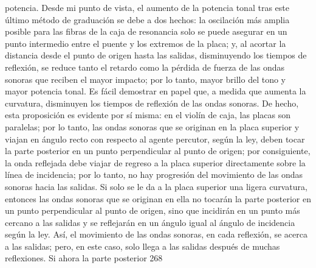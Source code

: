 potencia. Desde mi punto de vista, el aumento de la potencia tonal tras este último método de graduación se debe a dos hechos: la oscilación más amplia posible para las fibras de la caja de resonancia solo se puede asegurar en un punto intermedio entre el puente y los extremos de la placa; y, al acortar la distancia desde el punto de origen hasta las salidas, disminuyendo los tiempos de reflexión, se reduce tanto el retardo como la pérdida de fuerza de las ondas sonoras que reciben el mayor impacto; por lo tanto, mayor brillo del tono y mayor potencia tonal.
Es fácil demostrar en papel que, a medida que aumenta la curvatura, disminuyen los tiempos de reflexión de las ondas sonoras. De hecho, esta proposición es evidente por sí misma: en el violín de caja, las placas son paralelas; por lo tanto, las ondas sonoras que se originan en la placa superior y viajan en ángulo recto con respecto al agente percutor, según la ley, deben tocar la parte posterior en un punto perpendicular al punto de origen; por consiguiente, la onda reflejada debe viajar de regreso a la placa superior directamente sobre la línea de incidencia; por lo tanto, no hay progresión del movimiento de las ondas sonoras hacia las salidas. Si solo se le da a la placa superior una ligera curvatura, entonces las ondas sonoras que se originan en ella no tocarán la parte posterior en un punto perpendicular al punto de origen, sino que incidirán en un punto más cercano a las salidas y se reflejarán en un ángulo igual al ángulo de incidencia según la ley. Así, el movimiento de las ondas sonoras, en cada reflexión, se acerca a las salidas; pero, en este caso, solo llega a las salidas después de muchas reflexiones. Si ahora la parte posterior
268

